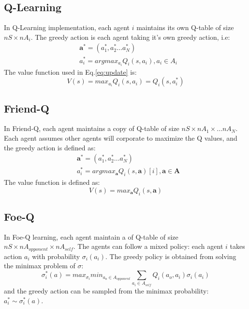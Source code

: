 \documentclass[conference]{IEEEtran}
\begin{document}
\subsection{Q-Learning}
In Q-Learning implementation, each agent $i$ maintains its own Q-table of size $nS\times nA_i$. The greedy action is each agent taking it's own greedy action, i.e:
\begin{align*}
& \mathbf{a^*} = (a_1^*, a_2^* \dots a_N^*) \\
& a_i^* = argmax_{a_i} Q_i(s, a_i), a_i \in A_i
\end{align*}
The value function used in Eq.\ref{eq:update} is:
\begin{equation}
V(s) = max_{a_i} Q_i(s, a_i) = Q_i(s, a_i^*)
\end{equation}

\subsection{Friend-Q}
In Friend-Q, each agent maintains a copy of Q-table of size $nS\times nA_1 \times\dots nA_N$. Each agent assumes other agents will corporate to maximize the Q values, and the greedy action is defined as:
\begin{align*}
& \mathbf{a^*} = (a_1^*, a_2^* \dots a_N^*) \\
& a_i^* = argmax_{\mathbf{a}} Q_i(s, \mathbf{a})[i], \mathbf{a} \in \mathbf{A}
\end{align*}
The value function is defined as:
\begin{equation}
V(s) = max_{\mathbf{a} } Q_i(s,  \mathbf{a})
\end{equation}

\subsection{Foe-Q}
In Foe-Q learning, each agent maintain a of Q-table of size $nS \times nA_{opponent} \times nA_{self}$. The agents can follow a mixed policy: each agent $i$ takes action $a_i$ with probability $\sigma_i(a_i)$. The greedy policy is obtained from solving the minimax problem of $\sigma$:
\begin{equation}
\sigma_i^*(a) = max_{\sigma_i} min_{a_o\in A_{opponent}} \sum_{a_i\in A_{self}}Q_i(a_o, a_i) \sigma_i(a_i)
\end{equation}
and the greedy action can be sampled from the minimax probability: $a_i^* \sim \sigma_i^*(a)$.
\end{document}

